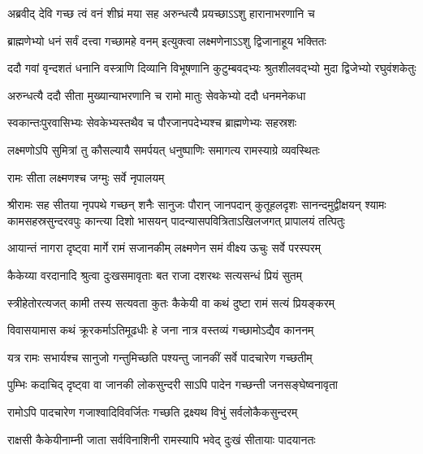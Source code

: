 \twolineshloka
{अब्रवीद् देवि गच्छ त्वं वनं शीघ्रं मया सह}
{अरुन्धत्यै प्रयच्छाऽऽशु हारानाभरणानि च} %

\twolineshloka
{ब्राह्मणेभ्यो धनं सर्वं दत्त्वा गच्छामहे वनम्}
{इत्युक्त्वा लक्ष्मणेनाऽऽशु द्विजानाहूय भक्तितः} %

\fourlineindentedshloka
{ददौ गवां वृन्दशतं धनानि}
{वस्त्राणि दिव्यानि विभूषणानि}
{कुटुम्बवद्भ्यः श्रुतशीलवद्भ्यो}
{मुदा द्विजेभ्यो रघुवंशकेतुः} %

\twolineshloka
{अरुन्धत्यै ददौ सीता मुख्यान्याभरणानि च}
{रामो मातुः सेवकेभ्यो ददौ धनमनेकधा} %

\twolineshloka
{स्वकान्तःपुरवासिभ्यः सेवकेभ्यस्तथैव च}
{पौरजानपदेभ्यश्च ब्राह्मणेभ्यः सहस्रशः} %

\twolineshloka
{लक्ष्मणोऽपि सुमित्रां तु कौसल्यायै समर्पयत्}
{धनुष्पाणिः समागत्य रामस्याग्रे व्यवस्थितः} %

\onelineshloka
{रामः सीता लक्ष्मणश्च जग्मुः सर्वे नृपालयम्} %

{श्रीरामः सह सीतया नृपपथे गच्छन् शनैः सानुजः}
{पौरान् जानपदान् कुतूहलदृशः सानन्दमुद्वीक्षयन्}
{श्यामः कामसहस्रसुन्दरवपुः कान्त्या दिशो भासयन्}
{पादन्यासपवित्रिताऽखिलजगत् प्रापालयं तत्पितुः} %





\twolineshloka
{आयान्तं नागरा दृष्ट्वा मार्गे रामं सजानकीम्}
{लक्ष्मणेन समं वीक्ष्य ऊचुः सर्वे परस्परम्} %

\twolineshloka
{कैकेय्या वरदानादि श्रुत्वा दुःखसमावृताः}
{बत राजा दशरथः सत्यसन्धं प्रियं सुतम्} %

\twolineshloka
{स्त्रीहेतोरत्यजत् कामी तस्य सत्यवता कुतः}
{कैकेयी वा कथं दुष्टा रामं सत्यं प्रियङ्करम्} %

\twolineshloka
{विवासयामास कथं क्रूरकर्माऽतिमूढधीः}
{हे जना नात्र वस्तव्यं गच्छामोऽद्यैव काननम्} %

\twolineshloka
{यत्र रामः सभार्यश्च सानुजो गन्तुमिच्छति}
{पश्यन्तु जानकीं सर्वे पादचारेण गच्छतीम्} %

\twolineshloka
{पुम्भिः कदाचिद् दृष्ट्वा वा जानकी लोकसुन्दरी}
{साऽपि पादेन गच्छन्ती जनसङ्घेष्वनावृता} %

\twolineshloka
{रामोऽपि पादचारेण गजाश्वादिविवर्जितः}
{गच्छति द्रक्ष्यथ विभुं सर्वलोकैकसुन्दरम्} %

\twolineshloka
{राक्षसी कैकेयीनाम्नी जाता सर्वविनाशिनी}
{रामस्यापि भवेद् दुःखं सीतायाः पादयानतः} %

